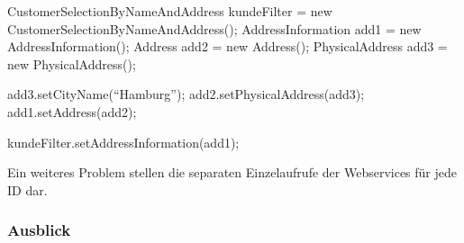 CustomerSelectionByNameAndAddress kundeFilter 	= new CustomerSelectionByNameAndAddress();
AddressInformation add1							= new AddressInformation();
Address add2 									= new Address();
PhysicalAddress add3 							= new PhysicalAddress();

add3.setCityName(``Hamburg'');
add2.setPhysicalAddress(add3);
add1.setAddress(add2);

kundeFilter.setAddressInformation(add1);
 

Ein weiteres Problem stellen die separaten Einzelaufrufe der Webservices für jede ID dar. 

\subsubsection{Ausblick}